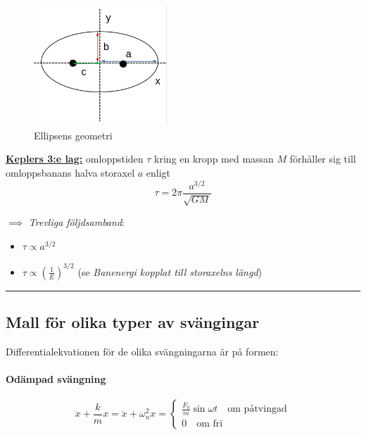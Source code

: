 \documentclass{article}
\newenvironment{ankiflashcard}[1]{}{}
\newcommand{\ruler}{
\rule{0.5\textwidth}{0.5pt}
}
\begin{document}
\begin{paracol}{2}
\begin{ankiflashcard}{Rita upp de olika sträckorna i en ellips.}
    
\begin{figure}[H]
    \centering
    \includegraphics[width=5cm]{ellipsens_geometri.png}
    \caption{Ellipsens geometri}
\end{figure}
\end{ankiflashcard}

\begin{ankiflashcard}{Formulera Keplers 3:e lag}
\underline{\textbf{Keplers 3:e lag:}} omloppstiden $\tau$ kring en kropp med massan $M$ förhåller sig till omloppsbanans halva storaxel $a$ enligt
$$
\tau = 2\pi \frac{a^{3/2}}{\sqrt{GM}}
$$
\end{ankiflashcard}

\begin{ankiflashcard}{Formulera några trevliga följdsamband för Keplers tredje lag}
$\implies$ \textit{Trevliga följdsamband}:
\begin{itemize}
    \item $\tau \propto a^{3/2}$
    \item $\tau \propto (\frac{1}{E})^{3/2}$ (se \textit{Banenergi kopplat till storaxelns längd})
\end{itemize}
\end{ankiflashcard}
\ruler
\subsection{Mall för olika typer av svängingar}
Differentialekvationen för de olika svängningarna är på formen:

\begin{ankiflashcard}{Ange basekvationerna för odämpade svängingar}
    
\paragraph{Odämpad svängning}
$$\ddot x + \frac{k}{m} x = \ddot x+\omega_n^2 x=\begin{cases}
\frac{F_0}{m} \sin \omega t \quad\text{om påtvingad}\\
0 \quad\text{om fri}
\end{cases}
$$
\end{ankiflashcard}


\end{paracol}
\end{document}
